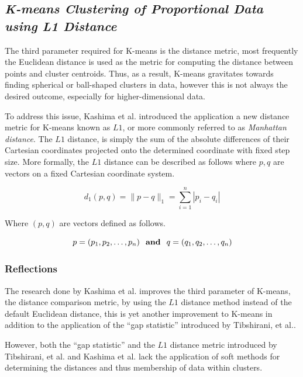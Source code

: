 \documentclass{article}
\newcommand{\bold}[1]{\textbf{#1}}
\begin{document}
\subsection{\emph{K-means Clustering of Proportional Data using L1 Distance}}

The third parameter required for K-means is the distance metric, most frequently the Euclidean distance is used as the metric for computing the distance between points and cluster centroids\cite{kashima2008k}. Thus, as a result, K-means gravitates towards finding spherical or ball-shaped clusters in data, however this is not always the desired outcome, especially for higher-dimensional data. 

To address this issue, Kashima et al. introduced the application a new distance metric for K-means known as $L1$, or more commonly referred to as \emph{Manhattan distance}. The $L1$ distance, is simply the sum of the absolute differences of their Cartesian coordinates projected onto the determined coordinate with fixed step size\cite{kashima2008k}. More formally, the $L1$ distance can be described as follows where $p, q$ are vectors on a fixed Cartesian coordinate system.

\begin{equation}
d_1(p, q) = \|p - q\|_1 = \sum_{i = 1}^{n} |p_i - q_i|
\label{eq:l1}
\end{equation}

Where $(p, q)$ are vectors defined as follows.

\begin{equation}
p = (p_1, p_2, \ldots, p_n) \mbox{ \bold{ and } } q = (q_1, q_2, \ldots, q_n)
\label{eq:l1vec}
\end{equation}



\subsubsection{Reflections}

The research done by Kashima et al. improves the third parameter of K-means, the distance comparison metric, by using the $L1$ distance method instead of the default Euclidean distance, this is yet another improvement to K-means in addition to the application of the ``gap statistic'' introduced by Tibshirani, et al.\cite{tibshirani2001estimating}.

However, both the ``gap statistic'' and the $L1$ distance metric introduced by Tibshirani, et al. and Kashima et al.\cite{tibshirani2001estimating, kashima2008k} lack the application of soft methods for determining the distances and thus membership of data within clusters.
\end{document}
